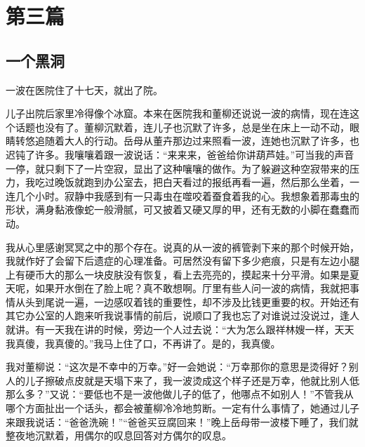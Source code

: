 \documentclass[12pt,oneside]{book}
\begin{document}
\part{第三篇}
\chapter{一个黑洞}
一波在医院住了十七天，就出了院。

儿子出院后家里冷得像个冰窟。本来在医院我和董柳还说说一波的病情，现在连这个话题也没有了。董柳沉默着，连儿子也沉默了许多，总是坐在床上一动不动，眼睛转悠追随着大人的行动。岳母从董卉那边过来照看一波，连她也沉默了许多，也迟钝了许多。我嚷嚷着跟一波说话：``来来来，爸爸给你讲葫芦娃。''可当我的声音一停，就只剩下了一片空寂，显出了这种嚷嚷的做作。为了躲避这种空寂带来的压力，我吃过晚饭就跑到办公室去，把白天看过的报纸再看一遍，然后那么坐着，一连几个小时。寂静中我感到有一只毒虫在噬咬着蚕食着我的心。我想象着那毒虫的形状，满身黏液像蛇一般滑腻，可又披着又硬又厚的甲，还有无数的小脚在蠢蠢而动。

我从心里感谢冥冥之中的那个存在。说真的从一波的裤管剥下来的那个时候开始，我就作好了会留下后遗症的心理准备。可居然没有留下多少疤痕，只是有左边小腿上有硬币大的那么一块皮肤没有恢复，看上去亮亮的，摸起来十分平滑。如果是夏天呢，如果开水倒在了脸上呢？真不敢想啊。厅里有些人问一波的病情，我就把事情从头到尾说一遍，一边感叹着钱的重要性，却不涉及比钱更重要的权。开始还有其它办公室的人跑来听我说事情的前后，说顺口了我也忘了对谁说过没说过，逢人就讲。有一天我在讲的时候，旁边一个人过去说：``大为怎么跟祥林嫂一样，天天我真傻，我真傻的。''我马上住了口，不再讲了。是的，我真傻。

我对董柳说：``这次是不幸中的万幸。''好一会她说：``万幸那你的意思是烫得好？别人的儿子擦破点皮就是天塌下来了，我一波烫成这个样子还是万幸，他就比别人低那么多？''又说：``要低也不是一波他做儿子的低了，他哪点不如别人！''不管我从哪个方面扯出一个话头，都会被董柳冷冷地剪断。一定有什么事情了，她通过儿子来跟我说话：``爸爸洗碗！''``爸爸买豆腐回来！''晚上岳母带一波楼下睡了，我们就整夜地沉默着，用偶尔的叹息回答对方偶尔的叹息。
\end{document}
